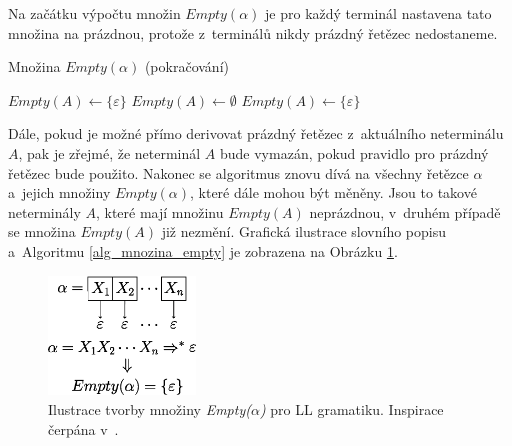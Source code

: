 Na začátku výpočtu množin $Empty(\alpha)$ je pro každý terminál nastavena tato množina na prázdnou, protože z~terminálů nikdy prázdný řetězec nedostaneme.

\begin{algorithm}[ht]
	\begin{algorithmic}[1]
		\caption{Množina $Empty(\alpha)$ (pokračování)}
		\State $Empty(A) \gets \{\varepsilon\}$
		\Else
		\State $Empty(A) \gets \emptyset$
		\EndIf
		\EndFor
		\State $Empty(A) \gets \{\varepsilon\}$
		\EndIf
		\EndWhile
	\end{algorithmic}
\end{algorithm}

Dále, pokud je možné přímo derivovat prázdný řetězec z~aktuálního neterminálu $A$, pak je zřejmé, že neterminál $A$ bude vymazán, pokud pravidlo pro prázdný řetězec bude použito.
Nakonec se algoritmus znovu dívá na všechny řetězce $\alpha$ a~jejich množiny $Empty(\alpha)$, které dále mohou být měněny.
Jsou to takové neterminály $A$, které mají množinu $Empty(A)$ neprázdnou, v~druhém případě se množina $Empty(A)$ již nezmění.
Grafická ilustrace slovního popisu a~Algoritmu \ref{alg_mnozina_empty} je zobrazena na Obrázku \ref{fig_mnozina_empty}.

\begin{figure}[ht]
    \centering
    \includegraphics[width=0.35\textwidth]{obrazky-figures/empty.eps}
    \caption{Ilustrace tvorby množiny \emph{Empty($\alpha$)} pro LL gramatiku. Inspirace čerpána v~\cite{meduna2017sa-shora-dolu}.}
    \label{fig_mnozina_empty}
\end{figure}

